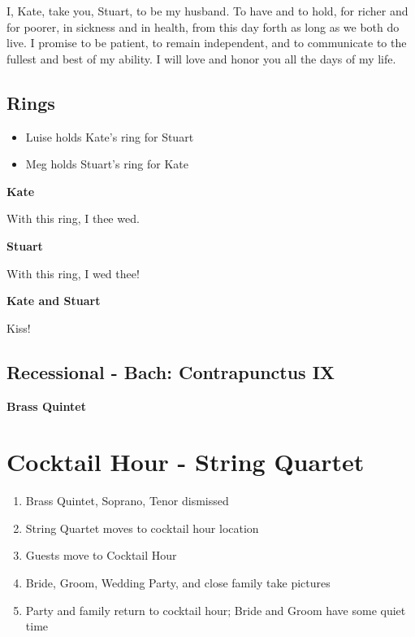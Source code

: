 \documentclass[twoside]{article}
\begin{document}
I, Kate, take you, Stuart, to be my husband. To have and to hold, for richer and for poorer, in sickness and in health, from this day forth as long as we both do live. I promise to be patient, to remain independent, and to communicate to the fullest and best of my ability. I will love and honor you all the days of my life.

  	   \subsection{Rings}
         \begin{itemize}
           \item Luise holds Kate's ring for Stuart
           \item Meg holds Stuart's ring for Kate
         \end{itemize}

          \begin{center}
          \textbf{Kate}
          \end{center}
  		    With this ring, I thee wed.
          \begin{center}
          \textbf{Stuart}
          \end{center}
          With this ring, I wed thee!
          \begin{center}
          \textbf{Kate and Stuart}
          \end{center}
          Kiss!
          
  	   \subsection{Recessional - Bach: Contrapunctus IX}
         \begin{center}
           \textbf{Brass Quintet}
         \end{center}

  \section{Cocktail Hour - String Quartet}
    \begin{enumerate}
    	\item Brass Quintet, Soprano, Tenor dismissed
    	\item String Quartet moves to cocktail hour location
    	\item Guests move to Cocktail Hour
    	\item Bride, Groom, Wedding Party, and close family take pictures
    	\item Party and family return to cocktail hour; Bride and Groom have some quiet time
    \end{enumerate}
    
\end{document}
